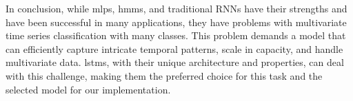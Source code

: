 In conclusion, while \acp{mlp}, \acp{hmm}, and traditional RNNs have their strengths and have been successful in many applications, they have problems with multivariate time series classification with many classes.
This problem demands a model that can efficiently capture intricate temporal patterns, scale in capacity, and handle multivariate data.
\acp{lstm}, with their unique architecture and properties, can deal with this challenge, making them the preferred choice for this task and the selected model for our implementation.
